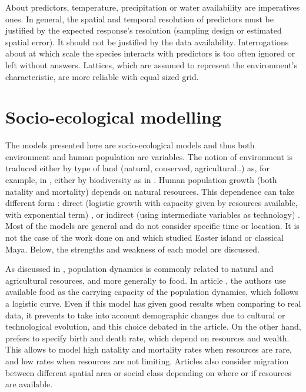 \documentclass{article}
\begin{document}
About predictors, temperature, precipitation or water availability are imperatives ones. In general, the spatial and temporal resolution of predictors must be justified by the expected response's resolution (sampling design or estimated spatial error). It should not be justified by the data availability. Interrogations about at which scale the species interacts with predictors is too often ignored or left without answers. Lattices, which are assumed to represent the environment's characteristic, are more reliable with equal sized grid.





\newpage
\section{Socio-ecological modelling}
The models presented here are socio-ecological models and thus both environment and human population are variables. The notion of environment is traduced either by type of land (natural, conserved, agricultural..) as, for example, in \cite{henderson_ecological_2019, henderson_unequal_2021, bengochea_paz_agricultural_2020}, either by biodiversity as in \cite{lafuite_time-delayed_2017}. Human population growth (both natality and mortality) depends on natural resources. This dependence can take different form : direct (logistic growth with capacity given by resources available, with exponential term) \cite{bengochea_paz_agricultural_2020, lafuite_time-delayed_2017},  or indirect (using intermediate variables as technology) \cite{henderson_ecological_2019, henderson_unequal_2021}. Most of the models are general and do not consider specific time or location. It is not the case of the work done on \cite{roman_coupled_2017} and \cite{roman_dynamics_2018} which studied Easter island or classical Maya. Below, the strengths and weakness of each model are discussed.

\medskip
As discussed in \cite{henderson_ecological_2019}, population dynamics is commonly related to natural and agricultural resources, and more generally to food. In article \cite{bengochea_paz_agricultural_2020}, the authors use available food as the carrying capacity of the population dynamics, which follows a logistic curve. Even if this model has given good results when comparing to real data, it prevents to take into account demographic changes due to cultural or technological evolution, and this choice debated in the article. On the other hand, \cite{henderson_ecological_2019, roman_coupled_2017} prefers to specify birth and death rate, which depend on resources and wealth. This allows to model high natality and mortality rates when resources are rare, and low rates when resources are not limiting. Articles \cite{roman_coupled_2017, henderson_unequal_2021, roman_dynamics_2018} also consider migration between different spatial area or social class depending on where or if resources are available.
\end{document}

